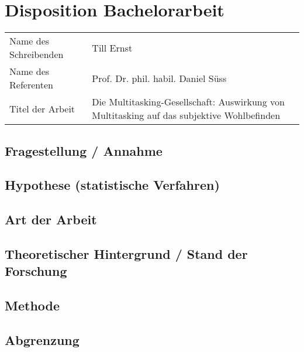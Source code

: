 %
%
\chapter*{Disposition Bachelorarbeit}\label{chap.dispo}
\glsresetall
\begin{tabularx}{17cm}{lX}
Name des Schreibenden & Till Ernst \\
Name des Referenten & Prof. Dr. phil. habil. Daniel Süss \\
Titel der Arbeit & Die Multitasking-Gesellschaft: Auswirkung von Multitasking auf das subjektive Wohlbefinden\\
\end{tabularx}
\section*{Fragestellung / Annahme}\label{section.fragestellung}
\section*{Hypothese (statistische Verfahren)}\label{section.hypothesen}
\section*{Art der Arbeit}\label{section.artArbeit}
\section*{Theoretischer Hintergrund / Stand der Forschung}\label{section.forschung}
\section*{Methode}\label{section.methode}
\section*{Abgrenzung}\label{section.abgrenzung}
